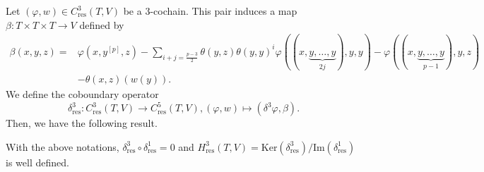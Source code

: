 \documentclass[11pt, twoside]{article}
\begin{document}
Let $(\varphi,w)\in C^3_\mathrm{res}(T,V) $ be a $3$-cochain. This pair induces a map $\beta:T\times T\times T\to V $ defined by \begin{align*}
    \beta(x,y,z)=& \varphi(x,y^{[p]},z)- \sum_{i+j=\frac{p-3}{2}}\theta(y,z)\theta(y,y)^i\varphi((x,\underbrace{y,\ldots,y}_{2j}),y,y) - \varphi((x,\underbrace{y,\ldots,y}_{p-1}),y,z)\\&- \theta(x,z)(w(y)).
\end{align*} We define the coboundary operator $$\delta_\mathrm{res}^3:C_\mathrm{res}^3(T,V)\to C_\mathrm{res}^5(T,V), (\varphi,w)\mapsto (\delta^3\varphi,\beta). $$ Then, we have the following result.

\begin{thm}
    With the above notations, $\delta_\mathrm{res}^3\circ \delta_\mathrm{res}^1=0 $ and $H_\mathrm{res}^3(T,V)= \mathrm{Ker}(\delta_\mathrm{res}^3)/\mathrm{Im}(\delta_\mathrm{res}^1) $ is well defined. 
\end{thm}
\end{document}

